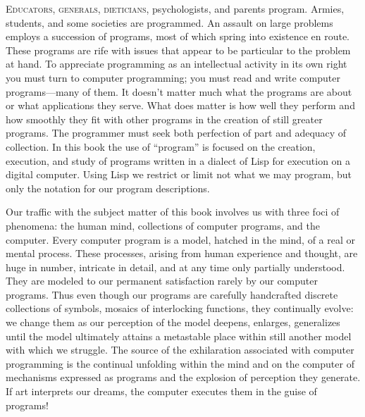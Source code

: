 \label{Foreword}

\lettrine{E}{ducators, generals, dieticians}, psychologists, and parents program.
Armies, students, and some societies are programmed.
An assault on large problems employs a succession of programs, most of which spring into existence en route.
These programs are rife with issues that appear to be particular to the problem at hand.
To appreciate programming as an intellectual activity in its own right you must turn to computer programming; you must read and write computer programs---many of them.
It doesn’t matter much what the programs are about or what applications they serve.
What does matter is how well they perform and how smoothly they fit with other programs in the creation of still greater programs.
The programmer must seek both perfection of part and adequacy of collection.
In this book the use of “program” is focused on the creation, execution, and study of programs written in a dialect of Lisp for execution on a digital computer.
Using Lisp we restrict or limit not what we may program, but only the notation for our program descriptions.

Our traffic with the subject matter of this book involves us with three foci of phenomena: the human mind, collections of computer programs, and the computer.
Every computer program is a model, hatched in the mind, of a real or mental process.
These processes, arising from human experience and thought, are huge in number, intricate in detail, and at any time only partially understood.
They are modeled to our permanent satisfaction rarely by our computer programs.
Thus even though our programs are carefully handcrafted discrete collections of symbols, mosaics of interlocking functions, they continually evolve:
we change them as our perception of the model deepens, enlarges, generalizes until the model ultimately attains a metastable place within still another model with which we struggle.
The source of the exhilaration associated with computer programming is the continual unfolding within the mind and on the computer of mechanisms expressed as programs and the explosion of perception they generate.
If art interprets our dreams, the computer executes them in the guise of programs!


